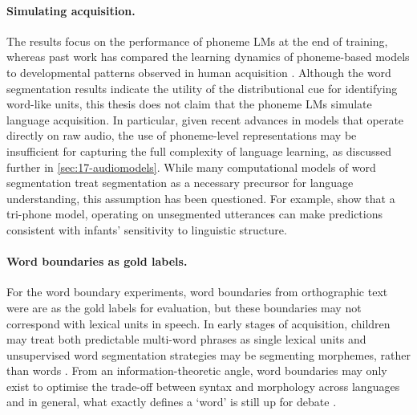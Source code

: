 \paragraph{Simulating acquisition.} The results focus on the performance of phoneme LMs at the end of training, whereas past work has compared the learning dynamics of phoneme-based models to developmental patterns observed in human acquisition \citep{kirov-2018-recurrent}. Although the word segmentation results indicate the utility of the distributional cue for identifying word-like units, this thesis does not claim that the phoneme LMs simulate language acquisition. In particular, given recent advances in models that operate directly on raw audio, the use of phoneme-level representations may be insufficient for capturing the full complexity of language learning, as discussed further in \cref{sec:17-audiomodels}. While many computational models of word segmentation treat segmentation as a necessary precursor for language understanding, this assumption has been questioned. For example, \citet{baayen2016} show that a tri-phone model, operating on unsegmented utterances can make predictions consistent with infants' sensitivity to linguistic structure. 


\paragraph{Word boundaries as gold labels.} For the word boundary experiments, word boundaries from orthographic text were are as the gold labels for evaluation, but these boundaries may not correspond with lexical units in speech. In early stages of acquisition, children may treat both predictable multi-word phrases as single lexical units \citep{macwhinney1978} and unsupervised word segmentation strategies may be segmenting morphemes, rather than words \citep{fleck2008lexicalized}. From an information-theoretic angle, word boundaries may only exist to optimise the trade-off between syntax and morphology across languages \citep{koplenig2017statistical, mosteiro2025word} and in general, what exactly defines a `word' is still up for debate \citep{dixon2002word, haspelmath2023defining}. 

